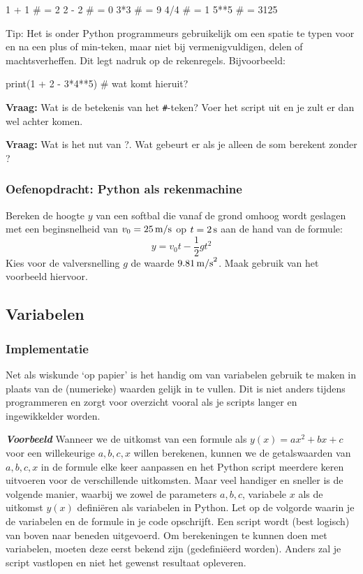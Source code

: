 \documentclass[a4paper,11pt, fleqn]{article}
\begin{document}
\begin{python}
1 + 1 # = 2
2 - 2 # = 0
3*3   # = 9
4/4   # = 1
5**5  # = 3125
\end{python}

Tip: Het is onder Python programmeurs gebruikelijk om een spatie te typen voor en na een plus of min-teken, maar niet bij vermenigvuldigen, delen of machtsverheffen. Dit legt nadruk op de rekenregels. Bijvoorbeeld: 

\begin{python}
print(1 + 2 - 3*4**5) # wat komt hieruit?
\end{python}
\textbf{Vraag:} Wat is de betekenis van het \verb,#,-teken? Voer het script uit en je zult er dan wel achter komen. 

\textbf{Vraag:} Wat is het nut van ?. Wat gebeurt er als je alleen de som berekent zonder ?
\subsubsection*{Oefenopdracht: Python als rekenmachine} Bereken de hoogte $y$ van een softbal die vanaf de grond omhoog wordt geslagen met een beginsnelheid van $v_0 = 25 \, {\rm m/s}$ op $t = 2 \, {\rm s}$ aan de hand van de formule:
\begin{equation}
y = v_0 t - \frac{1}{2}g t^2
\label{eq-ball}
\end{equation}
Kies voor de valversnelling $g$ de waarde $9.81 \, {\rm m/s}^2$. Maak gebruik van het voorbeeld hiervoor.

\subsection{Variabelen}
\label{sec-vars}

\subsubsection{Implementatie}
Net als wiskunde `op papier' is het handig om van variabelen gebruik te maken in plaats van de (numerieke) waarden gelijk in te vullen. Dit is niet anders tijdens programmeren en zorgt voor overzicht vooral als je scripts langer en ingewikkelder worden.

\textit{\textbf{Voorbeeld}} Wanneer we de uitkomst van een formule als $y(x) = ax^2+bx+c$ voor een willekeurige $a, b, c, x$ willen berekenen, kunnen we de getalswaarden van $a, b, c, x$ in de formule elke keer aanpassen en het Python script meerdere keren uitvoeren voor de verschillende uitkomsten. Maar veel handiger en sneller is de volgende manier, waarbij we zowel de parameters $a,b,c$, variabele $x$ als de uitkomst $y(x)$ defini\"eren als variabelen in Python. Let op de volgorde waarin je de variabelen en de formule in je code opschrijft. Een script wordt (best logisch) van boven naar beneden uitgevoerd. Om berekeningen te kunnen doen met variabelen, moeten deze eerst bekend zijn (gedefini\"eerd worden). Anders zal je script vastlopen en niet het gewenst resultaat opleveren.
\end{document}
